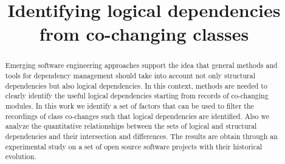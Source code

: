 \documentclass[conference]{IEEEtran}
\begin{document}
%

\title{Identifying logical dependencies from co-changing classes}


\author{
}











\maketitle

\begin{abstract}

Emerging software engineering approaches support the idea that general methods and tools for dependency management should take into account not only structural dependencies but also logical dependencies. In this context, methods are needed to clearly identify the useful logical dependencies starting from records of co-changing modules. In this work we identify a set of factors that can be used to filter the recordings of class co-changes such that logical dependencies are identified. Also we analyze the quantitative relationships between the sets of logical and structural dependencies and their intersection and differences. The results are obtain through an experimental study on a set of open source software projects with their historical evolution.

\end{abstract}
\end{document}
